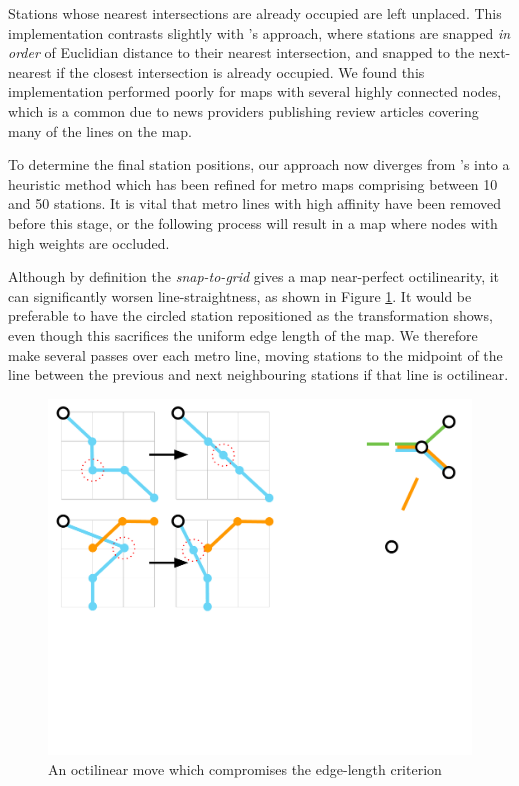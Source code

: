 Stations whose nearest intersections are already occupied are left unplaced. This implementation contrasts slightly with \citeauthor{AutomaticMetroMapLayoutThesis}'s approach, where stations are snapped \textit{in order} of Euclidian distance to their nearest intersection, and snapped to the next-nearest if the closest intersection is already occupied. We found this implementation performed poorly for maps with several highly connected nodes, which is a common due to news providers publishing review articles covering many of the lines on the map.

To determine the final station positions, our approach now diverges from \citeauthor{AutomaticMetroMapLayoutThesis}'s into a heuristic method which has been refined for metro maps comprising between 10 and 50 stations. It is vital that metro lines with high affinity have been removed before this stage, or the following process will result in a map where nodes with high weights are occluded.

Although by definition the \textit{snap-to-grid} gives a map near-perfect octilinearity, it can significantly worsen line-straightness, as shown in Figure \ref{fig:aoct}. It would be preferable to have the circled station repositioned as the transformation shows, even though this sacrifices the uniform edge length of the map. We therefore make several passes over each metro line, moving stations to the midpoint of the line between the previous and next neighbouring stations if that line is octilinear.
\begin{figure}[htbp!]
	\centering
	\includegraphics[width=.7\textwidth]{img/implementation/averagingoctilinear.pdf}
	\caption{An octilinear move which compromises the edge-length criterion}
	\label{fig:aoct}
\end{figure}

